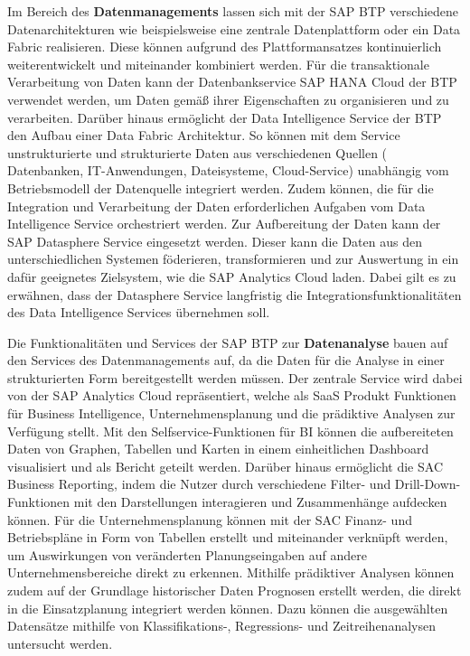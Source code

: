 Im Bereich des \textbf{Datenmanagements} lassen sich mit der SAP BTP verschiedene Datenarchitekturen wie beispielsweise eine zentrale Datenplattform oder ein Data Fabric realisieren. Diese können aufgrund des Plattformansatzes kontinuierlich weiterentwickelt und miteinander kombiniert werden. Für die transaktionale Verarbeitung von Daten kann der Datenbankservice SAP HANA Cloud der BTP verwendet werden, um Daten gemäß ihrer Eigenschaften zu organisieren und zu verarbeiten. Darüber hinaus ermöglicht der Data Intelligence Service der BTP den Aufbau einer Data Fabric Architektur. \autocite[Vgl.][S. 64-66]{SEUBERT} So können mit dem Service unstrukturierte und strukturierte Daten aus verschiedenen Quellen ( Datenbanken, IT-Anwendungen, Dateisysteme, Cloud-Service) unabhängig vom Betriebsmodell der Datenquelle integriert werden. Zudem können, die für die Integration und Verarbeitung der Daten erforderlichen Aufgaben vom Data Intelligence Service orchestriert werden. \autocite[Vgl.][]{DATAINTELLIGENCE} Zur Aufbereitung der Daten kann der SAP Datasphere Service eingesetzt werden. Dieser kann die Daten aus den unterschiedlichen Systemen föderieren, transformieren und zur Auswertung in ein dafür geeignetes Zielsystem, wie die SAP Analytics Cloud laden. \autocite[Vgl.][S. 3]{FSDDATASPHERE}  Dabei gilt es zu erwähnen, dass der Datasphere Service langfristig die Integrationsfunktionalitäten des Data Intelligence Services übernehmen soll. \autocite[Vgl.][]{QUIRK2023}

Die Funktionalitäten und Services der SAP BTP zur \textbf{Datenanalyse} bauen auf den Services des Datenmanagements auf, da die Daten für die Analyse in einer strukturierten Form bereitgestellt werden müssen. Der zentrale Service wird dabei von der SAP Analytics Cloud repräsentiert, welche als SaaS Produkt Funktionen für Business Intelligence, Unternehmensplanung und die prädiktive Analysen zur Verfügung stellt. Mit den Selfservice-Funktionen für BI können die aufbereiteten Daten von Graphen, Tabellen und Karten in einem einheitlichen Dashboard visualisiert und als Bericht geteilt werden. Darüber hinaus ermöglicht die SAC Business Reporting, indem die Nutzer durch verschiedene Filter- und Drill-Down-Funktionen mit den Darstellungen interagieren und Zusammenhänge aufdecken können. Für die Unternehmensplanung können mit der SAC Finanz- und Betriebspläne in Form von Tabellen erstellt und miteinander verknüpft werden, um Auswirkungen von veränderten Planungseingaben auf andere Unternehmensbereiche direkt zu erkennen. Mithilfe prädiktiver Analysen können zudem auf der Grundlage historischer Daten Prognosen erstellt werden, die direkt in die Einsatzplanung integriert werden können. \autocite[Vgl.][S. 64-67]{SEUBERT} Dazu können die ausgewählten Datensätze mithilfe von Klassifikations-, Regressions- und Zeitreihenanalysen untersucht werden. \autocite[Vgl.][]{FSDSAC2023}

